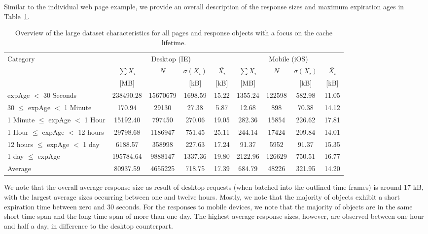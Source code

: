 \documentclass[letterpaper,journal,onecolumn,draftcls]{IEEEtran}
\begin{document}
Similar to the individual web page example, we provide an overall description of the response sizes and maximum expiration ages in Table~\ref{tab:dataset}.
\begin{table}
\centering
\caption{Overview of the large dataset characteristics for all pages and response objects with a focus on the cache lifetime.}
\label{tab:dataset}
\begin{tabular}{|l||c|c|c|c||c|c|c|c|}
	\hline
	Category                         & \multicolumn{4}{|c||}{Desktop (IE)}                       & \multicolumn{4}{|c|}{Mobile (iOS)}                      \\
	                                 & $\sum X_i $ &   $N$    & $\sigma(X_i)$ & $\overline{X_i}$ & $\sum X_i $ &  $N$   & $\sigma(X_i)$ & $\overline{X_i}$ \\
	                                 &    [MB]     &          &     [kB]      &       [kB]       &    [MB]     &        &     [kB]      &       [kB]       \\ \hline\hline
	expAge $<$ 30 Seconds            &  238490.28  & 15670679 &    1698.59    &      15.22       &   1355.24   & 122598 &    582.98     &      11.05       \\ \hline
	30 $\le$ expAge $<$ 1 Minute     &   170.94    &  29130   &     27.38     &       5.87       &    12.68    &  898   &     70.38     &      14.12       \\ \hline
	1 Minute $\le$ expAge $<$ 1 Hour &  15192.40   &  797450  &    270.06     &      19.05       &   282.36    & 15854  &    226.62     &      17.81       \\ \hline
	1 Hour $\le$ expAge $<$ 12 hours &  29798.68   & 1186947  &    751.45     &      25.11       &   244.14    & 17424  &    209.84     &      14.01       \\ \hline
	12 hours $\le$ expAge $<$ 1 day  &   6188.57   &  358998  &    227.63     &      17.24       &    91.37    &  5952  &     91.37     &      15.35       \\ \hline
	1 day $\le$ expAge               &  195784.64  & 9888147  &    1337.36    &      19.80       &   2122.96   & 126629 &    750.51     &      16.77       \\ \hline\hline
	Average                          &  80937.59   & 4655225  &    718.75     &      17.39       &   684.79    & 48226  &    321.95     &      14.20       \\ \hline
\end{tabular}
\end{table}
We note that the overall average response size as result of desktop requests (when batched into the outlined time frames) is around 17 kB, with the largest average sizes occurring between one and twelve hours.
Mostly, we note that the majority of objects exhibit a short expiration time between zero and 30 seconds.
For the responses to mobile devices, we note that the majority of objects are in the same short time span and the long time span of more than one day.
The highest average response sizes, however, are observed between one hour and half a day, in difference to the desktop counterpart.
\end{document}
